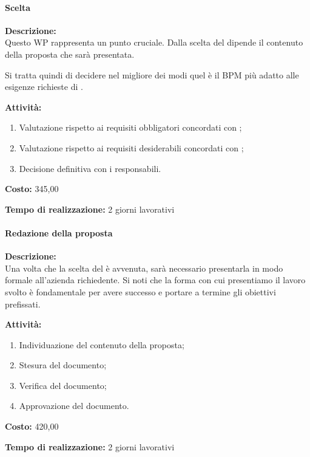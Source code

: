 \paragraph{Scelta \sw}
\begin{description}
\item{\bfseries Descrizione:}\\
Questo WP rappresenta un punto cruciale. Dalla scelta del  dipende il contenuto della proposta che sarà presentata.

Si tratta quindi di decidere  nel migliore dei modi quel è il  BPM più adatto alle esigenze richieste di \customer.

\item  {\bfseries Attività:}
	\begin{enumerate}
		\item Valutazione rispetto ai requisiti obbligatori concordati con \customer;
		\item Valutazione rispetto ai requisiti desiderabili concordati con \customer;
		\item Decisione definitiva con i responsabili.
		\end{enumerate}

\item  {\bfseries Costo:} \text{\euro} 345,00 
\item  {\bfseries Tempo di realizzazione:} 2 giorni lavorativi
\end{description}

\paragraph{Redazione della proposta }
\begin{description}
\item{\bfseries Descrizione:}\\
Una volta che la scelta del \sw è avvenuta, sarà necessario presentarla in modo formale all'azienda richiedente. Si noti che la forma con cui presentiamo il lavoro svolto è fondamentale per avere successo e portare a termine gli obiettivi prefissati.

\item  {\bfseries Attività:}
	\begin{enumerate}
	\item Individuazione del contenuto della proposta;
	\item Stesura del documento;
	\item Verifica del documento;
 	\item Approvazione del documento.	
	\end{enumerate}

\item  {\bfseries Costo:} \text{\euro} 420,00 
\item  {\bfseries Tempo di realizzazione:} 2 giorni lavorativi
\end{description}

